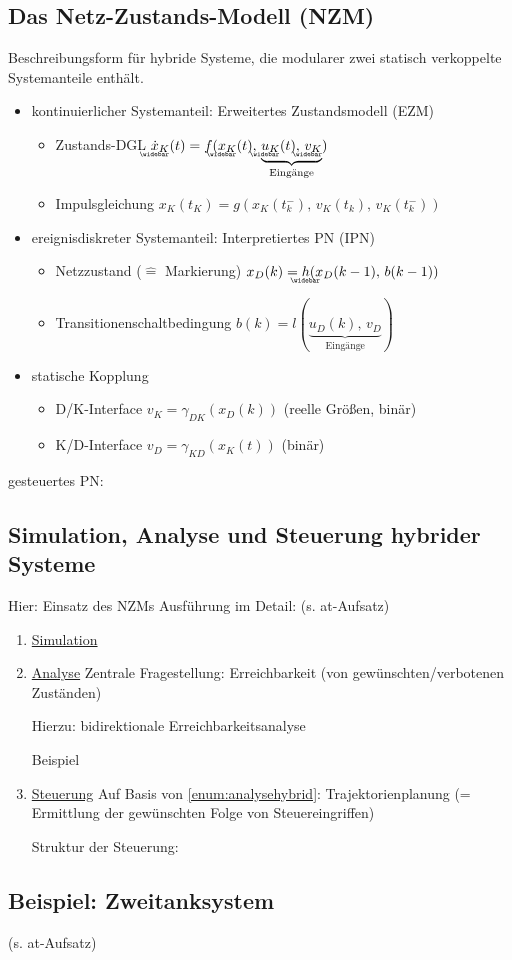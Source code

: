 \subsection{Das Netz-Zustands-Modell (NZM)}
Beschreibungsform für hybride Systeme, die modularer zwei statisch verkoppelte Systemanteile enthält.

\begin{itemize}
	\item kontinuierlicher Systemanteil: Erweitertes Zustandsmodell (EZM)
	\begin{itemize}
		\item Zustands-DGL $\wbar{\dot{x}}_K(t) = f(\wbar{x}_K(t),\,\underbrace{\wbar{u}_K(t),\,\wbar{v}_K}_{\text{Eingänge}})$
		\item Impulsgleichung $x_K(t_K) = g(x_K(t_k^-),\,v_K(t_k),\,v_K(t_k^-))$
	\end{itemize}
	\item ereignisdiskreter Systemanteil: Interpretiertes PN (IPN)
	\begin{itemize}
		\item Netzzustand ($\hat{=}$ Markierung) $x_D(k) = \wbar{h}(x_D(k-1),\,b(k-1))$
		\item Transitionenschaltbedingung $b(k) = l(\underbrace{u_D(k),\,v_D}_\text{Eingänge})$
	\end{itemize}
	\item statische Kopplung
	\begin{itemize}
		\item D/K-Interface $v_K = \gamma_{DK}(x_D(k))$ (reelle Größen, binär)
		\item K/D-Interface $v_D = \gamma_{KD}(x_K(t))$ (binär)
	\end{itemize}
\end{itemize}

gesteuertes PN: 

\subsection{Simulation, Analyse und Steuerung hybrider Systeme}
Hier: Einsatz des NZMs
Ausführung im Detail: (s. at-Aufsatz)

\begin{enumerate}
	\item \underline{Simulation}
	\item \underline{Analyse} \label{enum:analysehybrid}
	Zentrale Fragestellung: Erreichbarkeit (von gewünschten/verbotenen Zuständen)
	
	Hierzu: bidirektionale Erreichbarkeitsanalyse 
	
	Beispiel
	\item \underline{Steuerung}
	Auf Basis von \ref{enum:analysehybrid}: Trajektorienplanung (= Ermittlung der gewünschten Folge von Steuereingriffen)
	
	Struktur der Steuerung: 
\end{enumerate}

\subsection{Beispiel: Zweitanksystem}
(s. at-Aufsatz)


